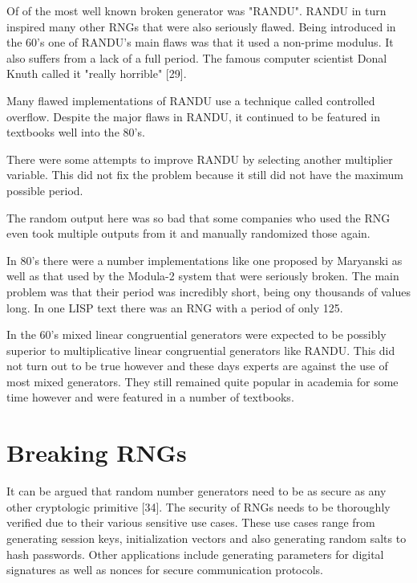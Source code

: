 \documentclass{article}
\begin{document}
    Of of the most well known broken generator was "RANDU". RANDU in turn
    inspired many other RNGs that were also seriously flawed.
    Being introduced in the 60's one of RANDU's main flaws
    was that it used a non-prime modulus. It also suffers from a lack
    of a full period. The famous computer scientist Donal Knuth called it "really horrible" [29].

    Many flawed implementations of RANDU use a technique called controlled overflow.
    Despite the major flaws in RANDU, it continued to be featured in textbooks well
    into the 80's.

    There were some attempts to improve RANDU by selecting another multiplier variable.
    This did not fix the problem because it still did not have the maximum possible period.

    The random output here was so bad that some companies who used the RNG even
    took multiple outputs from it and manually randomized those again.

    In 80's there were a number implementations like one proposed by Maryanski as well
    as that used by the Modula-2 system that were seriously broken.
    The main problem was that their period was incredibly short, being ony thousands
    of values long. In one LISP text there was an RNG with a period of only 125.

    In the 60's mixed linear congruential generators were expected to be possibly
    superior to multiplicative linear congruential generators like RANDU.
    This did not turn out to be true however and these days experts are against the
    use of most mixed generators.
    They still remained quite popular in academia for some time however and were
    featured in a number of textbooks.
    
    \section{Breaking RNGs}

    It can be argued that random number generators need to be as secure
    as any other cryptologic primitive [34].
    The security of RNGs needs to be thoroughly verified due to their
    various sensitive use cases.
    These use cases range from generating session keys, initialization vectors and
    also generating random salts to hash passwords.
    Other applications include generating parameters for digital signatures
    as well as nonces for secure communication protocols.
\end{document}
